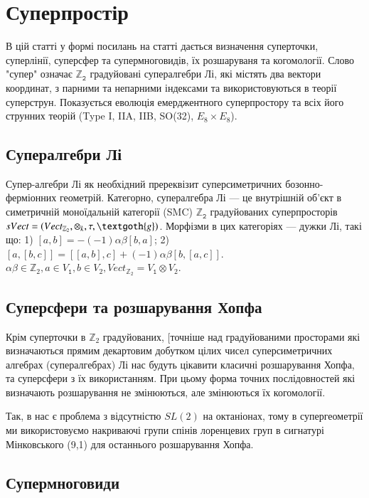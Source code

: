 \section{Суперпростір}

В цій статті у формі посилань на статті дається визначення суперточки,
суперлінії, суперсфер та супермноговидів, їх розшаруваня та когомології.
Слово "супер" означає $\mathbb{Z}_𝟸$ градуйовані супералгебри Лі, які містять два
вектори координат, з парними та непарними індексами та використовуються в теорії
суперструн. Показується еволюція емерджентного суперпростору та всіх його струнних
теорій (Type I, IIA, IIB, SO(32), $E_8\times E_8$).

\subsection*{Супералгебри Лі}

Супер-алгебри Лі як необхідний пререквізит суперсиметричних
бозонно-ферміонних геометрій. Категорно, супералгебра Лі --- це
внутрішній об'єкт в симетричній моноїдальній категорії (SMC) $\mathbb{Z}_𝟸$
градуйованих суперпросторів $sVect = (Vect_{\mathbb{Z}_2},\otimes_k, \tau, \textgoth{g})$.
Морфізми в цих категоріях --- дужки Лі, такі що:
1) $[a,b] = -(-1)\alpha\beta[b,a]$;
2) $[a,[b,c]]=[[a,b],c]+(-1)\alpha\beta[b,[a,c]]$.
$\alpha\beta \in \mathbb{Z}_2, a \in V_𝟷, b \in V_2, Vect_{\mathbb{Z}_2}=V_𝟷\otimes V_2$.

\subsection*{Суперсфери та розшарування Хопфа}

Крім суперточки в $\mathbb{Z}_2$ градуйованих, [точніше над градуйованими
просторами які визначаються прямим декартовим добутком цілих чисел
суперсиметричних алгебрах (супералгебрах) Лі нас будуть цікавити
класичні розшарування Хопфа, та суперсфери з їх використанням.
При цьому форма точних послідовностей які визначають розшарування
не змінюються, але змінюються їх когомології.

Так, в нас є проблема з відсутністю $SL(2)$ на октаніонах,
тому в супергеометрії ми використовуємо накриваючі групи
спінів лоренцевих груп в сигнатурі Мінковського (9,1)
для останнього розшарування Хопфа.

\subsection*{Супермноговиди}

